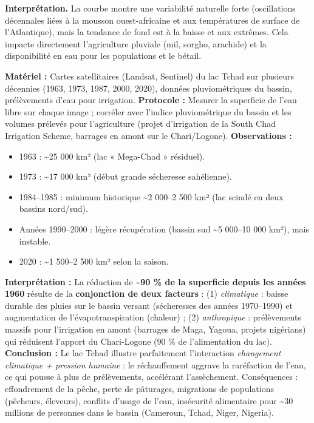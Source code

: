 \documentclass[11pt]{article}
\begin{document}
\noindent \textbf{Interprétation.} La courbe montre une variabilité naturelle forte (oscillations décennales liées à la mousson ouest-africaine et aux températures de surface de l'Atlantique), mais la tendance de fond est à la baisse et aux extrêmes. Cela impacte directement l'agriculture pluviale (mil, sorgho, arachide) et la disponibilité en eau pour les populations et le bétail.

\begin{experience}
\textbf{Matériel :} Cartes satellitaires (Landsat, Sentinel) du lac Tchad sur plusieurs décennies (1963, 1973, 1987, 2000, 2020), données pluviométriques du bassin, prélèvements d'eau pour irrigation.
\textbf{Protocole :} Mesurer la superficie de l'eau libre sur chaque image ; corréler avec l'indice pluviométrique du bassin et les volumes prélevés pour l'agriculture (projet d'irrigation de la South Chad Irrigation Scheme, barrages en amont sur le Chari/Logone).
\textbf{Observations :}
\begin{itemize}
    \item 1963 : \textasciitilde 25 000 km² (lac « Mega-Chad » résiduel).
    \item 1973 : \textasciitilde 17 000 km² (début grande sécheresse sahélienne).
    \item 1984--1985 : minimum historique \textasciitilde 2 000--2 500 km² (lac scindé en deux bassins nord/sud).
    \item Années 1990--2000 : légère récupération (bassin sud \textasciitilde 5 000--10 000 km²), mais instable.
    \item 2020 : \textasciitilde 1 500--2 500 km² selon la saison.
\end{itemize}
\textbf{Interprétation :} La réduction de \textbf{\textasciitilde 90 \% de la superficie depuis les années 1960} résulte de la \textbf{conjonction de deux facteurs} : (1) \emph{climatique} : baisse durable des pluies sur le bassin versant (sécheresses des années 1970--1990) et augmentation de l'évapotranspiration (chaleur) ; (2) \emph{anthropique} : prélèvements massifs pour l'irrigation en amont (barrages de Maga, Yagoua, projets nigérians) qui réduisent l'apport du Chari-Logone (90 \% de l'alimentation du lac).
\textbf{Conclusion :} Le lac Tchad illustre parfaitement l'interaction \emph{changement climatique + pression humaine} : le réchauffement aggrave la raréfaction de l'eau, ce qui pousse à plus de prélèvements, accélérant l'assèchement. Conséquences : effondrement de la pêche, perte de pâturages, migrations de populations (pêcheurs, éleveurs), conflits d'usage de l'eau, insécurité alimentaire pour \textasciitilde 30 millions de personnes dans le bassin (Cameroun, Tchad, Niger, Nigeria).
\end{experience}
\end{document}
